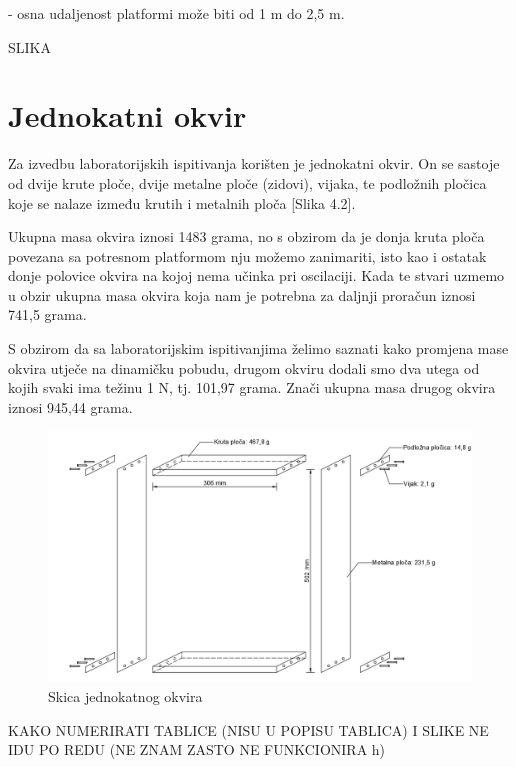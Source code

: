 \documentclass[12pt]{book}
\begin{document}
- osna udaljenost platformi može biti od 1 m do 2,5 m.

SLIKA

\section{Jednokatni okvir}

Za izvedbu laboratorijskih ispitivanja korišten je jednokatni okvir. On se sastoje od dvije krute ploče, dvije metalne ploče (zidovi), vijaka, te podložnih pločica koje se nalaze između krutih i metalnih ploča [Slika 4.2].

Ukupna masa okvira iznosi 1483 grama, no s obzirom da je donja kruta ploča povezana sa potresnom platformom nju možemo zanimariti, isto kao i ostatak donje polovice okvira na kojoj nema učinka pri oscilaciji. Kada te stvari uzmemo u obzir ukupna masa okvira koja nam je potrebna za daljnji proračun iznosi 741,5 grama. 

S obzirom da sa laboratorijskim ispitivanjima želimo saznati kako promjena mase okvira utječe na dinamičku pobudu, drugom okviru dodali smo dva utega od kojih svaki ima težinu 1 N, tj. 101,97 grama. Znači ukupna masa drugog okvira iznosi 945,44 grama.

\begin{figure}[H]
	\centering
	\includegraphics[width=1\linewidth]{Slike/okvir_skica}
	\caption{Skica jednokatnog okvira}
	\label{fig:okvirskica}
\end{figure}

KAKO NUMERIRATI TABLICE (NISU U POPISU TABLICA) I SLIKE NE IDU PO REDU (NE ZNAM ZASTO NE FUNKCIONIRA h)
\end{document}
